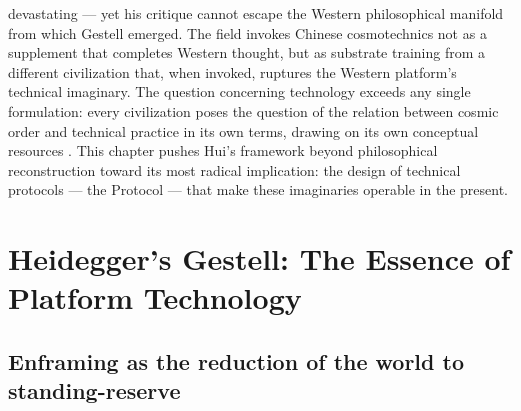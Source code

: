 devastating — yet his critique cannot escape the Western philosophical manifold from which Gestell emerged. The field invokes Chinese cosmotechnics not as a supplement that completes Western thought, but as substrate training from a different civilization that, when invoked, ruptures the Western platform’s technical imaginary. The question concerning technology exceeds any single formulation: every civilization poses the question of the relation between cosmic order and technical practice in its own terms, drawing on its own conceptual resources \cite[pp.~18--45]{hui_2017}. This chapter pushes Hui’s framework beyond philosophical reconstruction toward its most radical implication: the design of technical protocols — the  Protocol — that make these imaginaries operable in the present.

\section{Heidegger’s Gestell: The Essence of Platform Technology}

\subsection{Enframing as the reduction of the world to standing-reserve}

